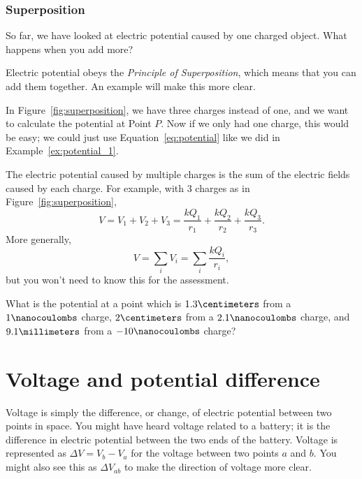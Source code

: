 \documentclass[12pt,paper=letter]{scrartcl}
\begin{document}
    \subsubsection{Superposition}

    So far, we have looked at electric potential caused by one charged object.
    What happens when you add more?

    \pnp

    Electric potential obeys the \emph{Principle of Superposition},
    which means that you can add them together.
    An example will make this more clear.

    

    \pnp

    In Figure~\ref{fig:superposition},
    we have three charges instead of one, and we want to calculate the potential at Point $P$.
    Now if we only had one charge, this would be easy;
    we could just use Equation~\ref{eq:potential} like we did in Example~\ref{ex:potential_1}.

    \begin{thmboxed}[Superposition]
        The electric potential caused by multiple charges is the sum of the electric fields caused by each charge.
        For example, with 3 charges as in Figure~\ref{fig:superposition},
        \begin{equation}
            V=V_1+V_2+V_3=\frac{kQ_1}{r_1}+\frac{kQ_2}{r_2}+\frac{kQ_3}{r_3}.
            \label{eq:superposition}
        \end{equation}
        More generally,
        \begin{equation}
            V = \sum_i V_i = \sum_i \frac{kQ_i}{r_i},
            \label{eq:advanced_superposition}
        \end{equation}
        but you won't need to know this for the assessment.
    \end{thmboxed}
    \begin{exrboxed}
        \label{exr:superposition}
        What is the potential at a point which is $1.3\centimeters$ from a $1\nanocoulombs$ charge, $2\centimeters$ from a $2.1 \nanocoulombs$ charge, and $9.1\millimeters$ from a $-10\nanocoulombs$ charge?
        \hint{\ref{hint:table_of_conversions}}
    \end{exrboxed}


    \section{Voltage and potential difference} \label{sec:voltage-and-potential-difference}
    Voltage is simply the difference, or change, of electric potential between two points in space.
    You might have heard voltage related to a battery;
    it is the difference in electric potential between the two ends of the battery.
    \pnp
    Voltage is represented as $\Delta V = V_b - V_a$ for the voltage between two points $a$ and $b$.
    You might also see this as $\Delta V_{ab}$ to make the direction of
    voltage more clear. 
\end{document}
